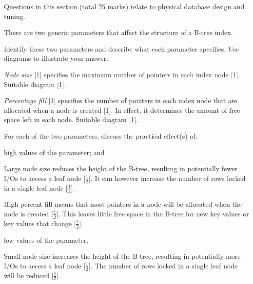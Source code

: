 \documentclass[markingschedule]{ouexam}
\begin{document}
\begin{examsection}{25}{}{Questions in this section (total 25 marks) relate to
physical database design and tuning.}
\begin{question}{10}

\end{question}


\newpage


\begin{question}{10}
	There are two generic parameters that affect the structure of a B-tree
	index.


	\begin{subquestion}{6}
		Identify these two parameters and describe what each parameter
		specifies. Use diagrams to illustrate your answer.
		\begin{marking}
			\emph{Node size} [1] specifies the maximum number of pointers in
			each index node [1]. Suitable diagram [1].

			\emph{Percentage fill} [1] specifies the number of pointers in each
			index node that are allocated when a node is created [1]. In
			effect, it determines the amount of free space left in each node.
			Suitable diagram [1].
		\end{marking}
	\end{subquestion}
	

	\begin{subquestion}{4}
		For each of the two parameters, discuss the practical effect(s) of:
		\begin{subsubquestion}{2}
			high values of the parameter; and
			\begin{marking}
				Large node size reduces the height of the B-tree, resulting in
				potentially fewer I/Os to access a leaf node [$\frac{1}{2}$].
				It can however increase the number of rows locked in a single
				leaf node [$\frac{1}{2}$].
	
				High percent fill means that most pointers in a node will be
				allocated when the node is created [$\frac{1}{2}$]. This leaves
				little free space in the B-tree for new key values or key
				values that change [$\frac{1}{2}$].
			\end{marking}
		\end{subsubquestion}
		\begin{subsubquestion}{2}
			low values of the parameter.
			\begin{marking}
				Small node size increases the height of the B-tree, resulting
				in potentially more I/Os to access a leaf node [$\frac{1}{2}$].
				The number of rows locked in a single leaf node will be reduced
				[$\frac{1}{2}$].
	

\end{marking}
\end{subsubquestion}
\end{subquestion}
\end{question}
\end{examsection}
\end{document}
